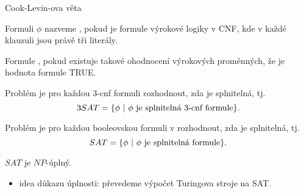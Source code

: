     
    
    \begin{frame}{Cook-Levin-ova věta}
    \begin{definition}
    Formuli $\phi$ nazveme , pokud je formule výrokové logiky v CNF, kde v každé klauzuli jsou právě tři literály.
    
    Formule , pokud existuje takové ohodnocení výrokových proměnných, že je hodnota formule TRUE.
    
    Problém  je pro každou 3-cnf formuli rozhodnout, zda je splnitelná, tj.
    $$3SAT=\{\phi \ |\  \phi \hbox{ je splnitelná 3-cnf formule}\}\hbox{.}
    $$
    
    Problém  je pro každou booleovskou formuli v rozhodnout, zda je splnitelná, tj.
    $$SAT=\{\phi \ |\  \phi \hbox{ je splnitelná formule}\}\hbox{.}
    $$
    \end{definition}
    
    \begin{theorem}
    $SAT$ je $NP$-úplný.
    \end{theorem}
    \begin{itemize}
        \item idea důkazu úplnosti: převedeme výpočet Turingova stroje na SAT.
    \end{itemize}
    \end{frame}
    
